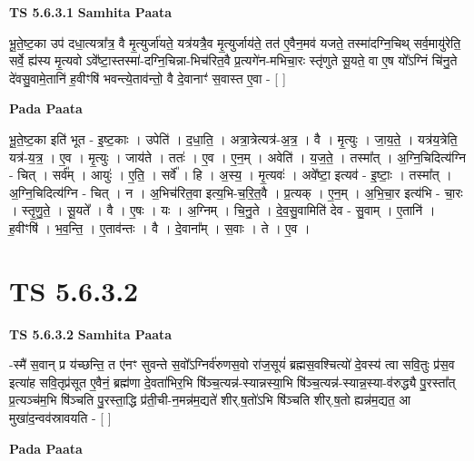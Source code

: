 \documentclass[17pt]{extarticle}
\begin{document}
\textbf{TS 5.6.3.1 } \newline
\textbf{Samhita Paata} \newline

भू॒ते॒ष्ट॒का उप॑ दधा॒त्यत्रा᳚त्र॒ वै मृ॒त्युर्जा॑यते॒ यत्र॑यत्रै॒व मृ॒त्युर्जाय॑ते॒ तत॑ ए॒वैन॒मव॑ यजते॒ तस्मा॑दग्नि॒चिथ् सर्व॒मायु॑रेति॒ सर्वे॒ ह्य॑स्य मृ॒त्यवो ऽवे᳚ष्टा॒स्तस्मा॑-दग्नि॒चिन्ना-भिच॑रित॒वै प्र॒त्यगे॑न-मभिचा॒रः स्तृ॑णुते सू॒यते॒ वा ए॒ष यो᳚ऽग्निं चि॑नु॒ते दे॑वसु॒वामे॒तानि॑ ह॒वीꣳषि॑ भवन्त्ये॒ताव॑न्तो॒ वै दे॒वानाꣳ॑ स॒वास्त ए॒वा - [  ] \newline

\textbf{Pada Paata} \newline

भू॒ते॒ष्ट॒का इति॑ भूत - इ॒ष्ट॒काः । उपेति॑ । द॒धा॒ति॒ । अत्रा॒त्रेत्यत्र॑-अ॒त्र॒ । वै । मृ॒त्युः । जा॒य॒ते॒ । यत्र॑य॒त्रेति॒ यत्र॑-य॒त्र॒ । ए॒व । मृ॒त्युः । जाय॑ते । ततः॑ । ए॒व । ए॒न॒म् । अवेति॑ । य॒ज॒ते॒ । तस्मा᳚त् । अ॒ग्नि॒चिदित्य॑ग्नि - चित् । सर्व᳚म् । आयुः॑ । ए॒ति॒ । सर्वे᳚ । हि । अ॒स्य॒ । मृ॒त्यवः॑ । अवे᳚ष्टा॒ इत्यव॑ - इ॒ष्टाः॒ । तस्मा᳚त् । अ॒ग्नि॒चिदित्य॑ग्नि - चित् । न । अ॒भिच॑रित॒वा इत्य॒भि-च॒रि॒त॒वै । प्र॒त्यक् । ए॒न॒म् । अ॒भि॒चा॒र इत्य॑भि - चा॒रः । स्तृ॒णु॒ते॒ । सू॒यते᳚ । वै । ए॒षः । यः । अ॒ग्निम् । चि॒नु॒ते । दे॒व॒सु॒वामिति॑ देव - सु॒वाम् । ए॒तानि॑ । ह॒वीꣳषि॑ । भ॒व॒न्ति॒ । ए॒ताव॑न्तः । वै । दे॒वाना᳚म् । स॒वाः । ते । ए॒व ।  \newline





\section{ TS 5.6.3.2 }

\textbf{TS 5.6.3.2 } \newline
\textbf{Samhita Paata} \newline

-स्मै॑ स॒वान् प्र य॑च्छन्ति॒ त ए॑नꣳ सुवन्ते स॒वो᳚ऽग्निर्व॑रुणस॒वो रा॑ज॒सूयं॑ ब्रह्मस॒वश्चित्यो॑ दे॒वस्य॑ त्वा सवि॒तुः प्र॑स॒व इत्या॑ह सवि॒तृप्र॑सूत ए॒वैनं॒ ब्रह्म॑णा दे॒वता॑भिर॒भि षि॑ञ्च॒त्यन्न॑-स्यान्नस्या॒भि षि॑ञ्च॒त्यन्न॑-स्यान्न॒स्या-व॑रुद्ध्यै पु॒रस्ता᳚त् प्र॒त्यञ्च॑म॒भि षि॑ञ्चति पु॒रस्ता॒द्धि प्र॑ती॒ची-न॒मन्न॑म॒द्यते॑ शीर्.ष॒तो॑ऽभि षि॑ञ्चति शीर्.ष॒तो ह्यन्न॑म॒द्यत॒ आ मुखा॑द॒न्वव॑स्रावयति - [  ] \newline

\textbf{Pada Paata} \newline
\end{document}
